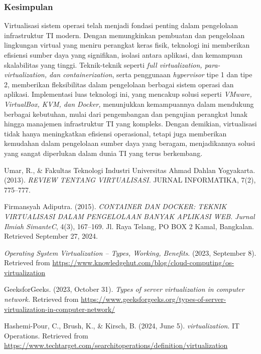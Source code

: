 \documentclass[12pt]{article}
\begin{document}
\subsubsection{Kesimpulan}
    \par Virtualisasi sistem operasi telah menjadi fondasi penting dalam pengelolaan infrastruktur TI modern. Dengan memungkinkan pembuatan dan pengelolaan lingkungan virtual yang meniru perangkat keras fisik, teknologi ini memberikan efisiensi sumber daya yang signifikan, isolasi antara aplikasi, dan kemampuan skalabilitas yang tinggi. Teknik-teknik seperti\textit{ full virtualization, para-virtualization, dan containerization}, serta penggunaan \textit{hypervisor} tipe 1 dan tipe 2, memberikan fleksibilitas dalam pengelolaan berbagai sistem operasi dan aplikasi. Implementasi luas teknologi ini, yang mencakup solusi seperti \textit{VMware, VirtualBox, KVM, dan Docker,} menunjukkan kemampuannya dalam mendukung berbagai kebutuhan, mulai dari pengembangan dan pengujian perangkat lunak hingga manajemen infrastruktur TI yang kompleks. Dengan demikian, virtualisasi tidak hanya meningkatkan efisiensi operasional, tetapi juga memberikan kemudahan dalam pengelolaan sumber daya yang beragam, menjadikannya solusi yang sangat diperlukan dalam dunia TI yang terus berkembang.

    \begin{thebibliography}{9}
        Umar, R., \& Fakultas Teknologi Industri Universitas Ahmad Dahlan Yogyakarta. (2013).\textit{ REVIEW TENTANG VIRTUALISASI.} JURNAL INFORMATIKA, 7(2), 775–777. 
        
        Firmansyah Adiputra. (2015). \textit{CONTAINER DAN DOCKER: TEKNIK VIRTUALISASI DALAM PENGELOLAAN BANYAK APLIKASI WEB.} \textit{Jurnal Ilmiah SimanteC}, 4(3), 167–169. Jl. Raya Telang, PO BOX 2 Kamal, Bangkalan. Retrieved September 27, 2024.
        
        \textit{Operating System Virtualization – Types, Working, Benefits}. (2023, September 8). Retrieved from \url{https://www.knowledgehut.com/blog/cloud-computing/os-virtualization}
        
        GeeksforGeeks. (2023, October 31). \textit{Types of server virtualization in computer network.} Retrieved from \url{https://www.geeksforgeeks.org/types-of-server-virtualization-in-computer-network/}
        
        Hashemi-Pour, C., Brush, K., \& Kirsch, B. (2024, June 5). \textit{virtualization}. IT Operations. Retrieved from \url{https://www.techtarget.com/searchitoperations/definition/virtualization}
    \end{thebibliography}
\end{document}
